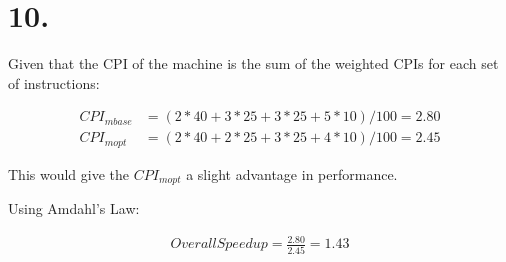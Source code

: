\documentclass[12pt]{article}
\begin{document}
\section*{10.}

Given that the CPI of the machine is the sum of the weighted CPIs for each set of instructions:

\begin{align*}
	CPI_{mbase} &= (2 * 40 + 3 * 25 + 3 * 25 + 5 * 10) / 100 = 2.80 \\
	CPI_{mopt} &= (2 * 40 + 2 * 25 + 3 * 25 + 4 * 10) / 100 = 2.45
\end{align*}

This would give the $CPI_{mopt}$ a slight advantage in performance.

Using Amdahl's Law:

\begin{align*}
Overall Speedup = \frac{2.80}{2.45} = 1.43 
\end{align*}
\end{document}
